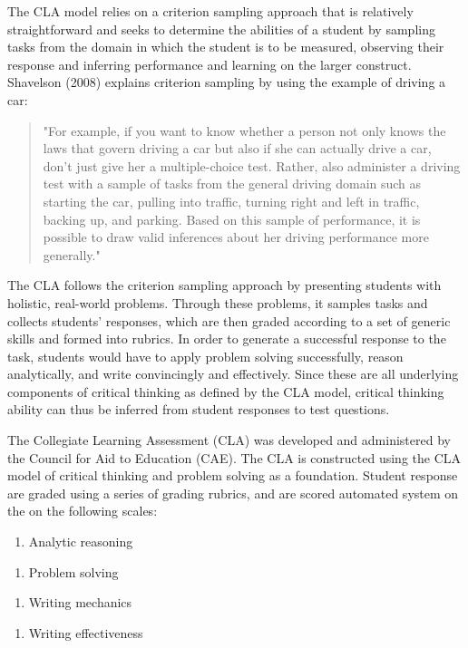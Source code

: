 The CLA model relies on a criterion sampling approach that is relatively straightforward and seeks to determine the abilities of a student by sampling tasks from the domain in which the student is to be measured, observing their response and inferring performance and learning on the larger construct. Shavelson (2008) explains criterion sampling by using the example of driving a car:

\begin{quote}
"For example, if you want to know whether a person not only knows the laws that govern driving a car but also if she can actually drive a car, don’t just give her a multiple-choice test. Rather, also administer a driving test with a sample of tasks from the general driving domain such as starting the car, pulling into traffic, turning right and left in traffic, backing up, and parking. Based on this sample of performance, it is possible to draw valid inferences about her driving performance more generally."
\end{quote}

The CLA follows the criterion sampling approach by presenting students with holistic, real-world problems. Through these problems, it samples tasks and collects students’ responses, which are then graded according to a set of generic skills and formed into rubrics. In order to generate a successful response to the task, students would have to apply problem solving successfully, reason analytically, and write convincingly and effectively. Since these are all underlying components of critical thinking as defined by the CLA model, critical thinking ability can thus be inferred from student responses to test questions.

The Collegiate Learning Assessment (CLA) was developed and administered by the Council for Aid to Education (CAE).  The CLA is constructed using the CLA model of critical thinking and problem solving as a foundation. Student response are graded using a series of grading rubrics, and are scored automated system on the on the following scales\cite{Shavelson:2008vo}:

\begin{enumerate}
\item Analytic reasoning
\end{enumerate}
\begin{enumerate}
\item Problem solving
\end{enumerate}
\begin{enumerate}
\item Writing mechanics
\end{enumerate}
\begin{enumerate}
\item Writing effectiveness
\end{enumerate}

